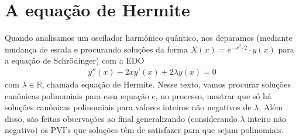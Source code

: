 \documentclass{article}
\begin{document}
\section{A equação de Hermite}
\hspace{12pt} Quando analisamos um oscilador harmônico quântico, nos deparamos (mediante mudança de escala e procurando soluções da forma $X(x) = e^{-x^2/2}\cdot y(x)$ para a equação de Schrödinger) com a EDO
\begin{align}
y''(x) - 2xy'(x) + 2\lambda y(x) = 0
\end{align} 
com $\lambda \in\mathbb{R}$, chamada equação de Hermite. Nesse texto, vamos procurar soluções canônicas polinomiais para essa equação e, no processo, mostrar que só há soluções canônicas polinomiais para valores inteiros não negativos de $\lambda$. Além disso, são feitas observações ao final generalizando (considerando $\lambda$ inteiro não negativo) os PVI's que soluções têm de satisfazer para que sejam polinomiais. 
\end{document}
